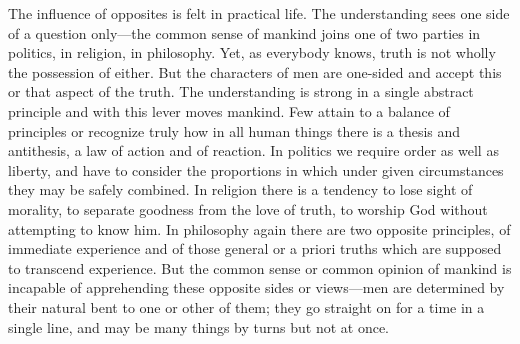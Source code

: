 \documentclass[11pt,letter]{article}
\begin{document}
\par  The influence of opposites is felt in practical life. The understanding sees one side of a question only—the common sense of mankind joins one of two parties in politics, in religion, in philosophy. Yet, as everybody knows, truth is not wholly the possession of either. But the characters of men are one-sided and accept this or that aspect of the truth. The understanding is strong in a single abstract principle and with this lever moves mankind. Few attain to a balance of principles or recognize truly how in all human things there is a thesis and antithesis, a law of action and of reaction. In politics we require order as well as liberty, and have to consider the proportions in which under given circumstances they may be safely combined. In religion there is a tendency to lose sight of morality, to separate goodness from the love of truth, to worship God without attempting to know him. In philosophy again there are two opposite principles, of immediate experience and of those general or a priori truths which are supposed to transcend experience. But the common sense or common opinion of mankind is incapable of apprehending these opposite sides or views—men are determined by their natural bent to one or other of them; they go straight on for a time in a single line, and may be many things by turns but not at once.
\end{document}
